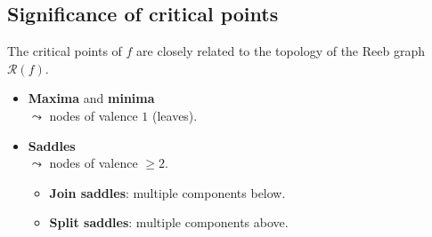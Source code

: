 \subsection*{Significance of critical points}
\begin{frame*}
The critical points of $f$ are closely related to the topology of the Reeb graph $\mathcal{R}(f)$.
\begin{itemize}
\item \textbf{Maxima} and \textbf{minima}\\
$\leadsto$ nodes of valence $1$ (leaves).
\item \textbf{Saddles}\\
$\leadsto$ nodes of valence $\ge 2$.\\
\begin{itemize}
\item \textbf{Join saddles}: multiple components below.
\item \textbf{Split saddles}: multiple components above.
\end{itemize}
\end{itemize}
\end{frame*}